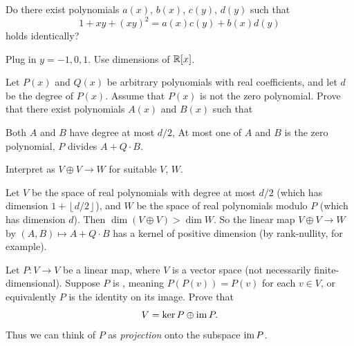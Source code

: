 \begin{problem}
	[Putnam 2003]
	Do there exist polynomials $a(x)$, $b(x)$, $c(y)$, $d(y)$ such that
	\[ 1 + xy + (xy)^2 = a(x)c(y) + b(x)d(y) \]
	holds identically?
	\begin{hint}
		Plug in $y = -1, 0, 1$. Use dimensions of $\mathbb R[x]$.
	\end{hint}
\end{problem}

\begin{problem}[TSTST 2014]
	\onechili
	Let $P(x)$ and $Q(x)$ be arbitrary polynomials with real coefficients,
	and let $d$ be the degree of $P(x)$.
	Assume that $P(x)$ is not the zero polynomial.
	Prove that there exist polynomials $A(x)$ and $B(x)$ such that
	\begin{enumerate}[(i)]
		\ii Both $A$ and $B$ have degree at most $d/2$,
		\ii At most one of $A$ and $B$ is the zero polynomial,
		\ii $P$ divides $A+Q \cdot B$.
	\end{enumerate}
	\begin{hint}
		Interpret as $V \oplus V \to W$ for suitable $V$, $W$.
	\end{hint}
	\begin{sol}
		Let $V$ be the space of real polynomials with degree at most $d/2$
		(which has dimension $1 + \left\lfloor d/2 \right\rfloor$),
		and $W$ be the space of real polynomials modulo $P$ (which has dimension $d$).
		Then $\dim (V \oplus V) > \dim W$.
		So the linear map $V \oplus V \to W$ by $(A,B) \mapsto A + Q \cdot B$
		has a kernel of positive dimension
		(by rank-nullity, for example).
	\end{sol}
\end{problem}

\begin{sproblem}
	\label{prob:idempotent}
	Let $P \colon V \to V$ be a linear map,
	where $V$ is a vector space
	(not necessarily finite-dimensional).
	Suppose $P$ is ,
	meaning $P(P(v)) = P(v)$ for each $v \in V$,
	or equivalently $P$ is the identity on its image.
	Prove that \[ V = \ker P \oplus \operatorname{im} P. \]
	Thus we can think of $P$ as \emph{projection}
	onto the subspace $\operatorname{im} P$.
\end{sproblem}

